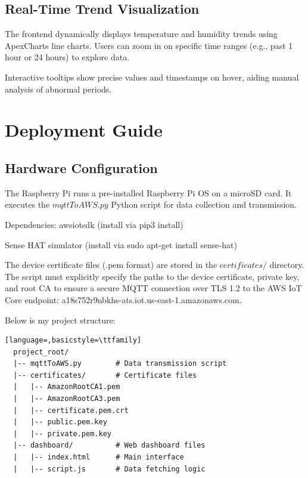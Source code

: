\documentclass[12pt,a4paper]{article}
\begin{document}
\subsection{Real-Time Trend Visualization}
The frontend dynamically displays temperature and humidity trends using ApexCharts line charts. Users can zoom in on specific time ranges (e.g., past 1 hour or 24 hours) to explore data.

\vspace{\baselineskip}
\noindent
Interactive tooltips show precise values and timestamps on hover, aiding manual analysis of abnormal periods.


\section{Deployment Guide}

\subsection{Hardware Configuration}
The Raspberry Pi runs a pre-installed Raspberry Pi OS on a microSD card. It executes the $mqttToAWS.py$ Python script for data collection and transmission.

\vspace{\baselineskip}
\noindent
Dependencies: awsiotsdk (install via pip3 install)

\vspace{\baselineskip}
\noindent
Sense HAT simulator (install via sudo apt-get install sense-hat)

\vspace{\baselineskip}
\noindent
The device certificate files (.pem format) are stored in the $certificates/$ directory. The script must explicitly specify the paths to the device certificate, private key, and root CA to ensure a secure MQTT connection over TLS 1.2 to the AWS IoT Core endpoint: a18s752r9nbkhs-ats.iot.us-east-1.amazonaws.com.

\vspace{\baselineskip}
\noindent
Below is my project structure:

\begin{lstlisting}[language=,basicstyle=\ttfamily]
  project_root/
  |-- mqttToAWS.py        # Data transmission script
  |-- certificates/       # Certificate files
  |   |-- AmazonRootCA1.pem
  |   |-- AmazonRootCA3.pem
  |   |-- certificate.pem.crt
  |   |-- public.pem.key
  |   |-- private.pem.key
  |-- dashboard/          # Web dashboard files
  |   |-- index.html      # Main interface
  |   |-- script.js       # Data fetching logic
  \end{lstlisting}
\end{document}
